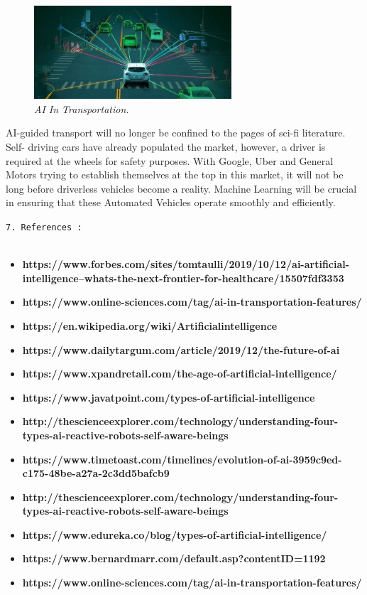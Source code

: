 \documentclass{article}
\begin{document}
\begin{figure}
\centering
\includegraphics[width=2.9in]{AI Transport}

\caption{\textit{AI In Transportation.}}
\end{figure}
AI-guided transport will no longer be confined to the pages of sci-fi literature. Self- driving cars have already populated the market, however, a driver is required at the wheels for safety purposes. With Google, Uber and General Motors trying to establish themselves at the top in this market, it will not be long before driverless vehicles become a reality. Machine Learning will be crucial in ensuring that these Automated Vehicles operate smoothly and efficiently.\\[2cm]


\begin{large}
\texttt{7. References :}\\\\
\end{large}

\begin{itemize}
\item\textbf{https://www.forbes.com/sites/tomtaulli/2019/10/12/ai-artificial-intelligence--whats-the-next-frontier-for-healthcare/15507fdf3353}
\item\textbf{https://www.online-sciences.com/tag/ai-in-transportation-features/}
\item\textbf{https://en.wikipedia.org/wiki/Artificialintelligence}
\item\textbf{https://www.dailytargum.com/article/2019/12/the-future-of-ai}
\item\textbf{https://www.xpandretail.com/the-age-of-artificial-intelligence/}
\item\textbf{https://www.javatpoint.com/types-of-artificial-intelligence}
\item\textbf{http://thescienceexplorer.com/technology/understanding-four-types-ai-reactive-robots-self-aware-beings}
\item\textbf{https://www.timetoast.com/timelines/evolution-of-ai-3959c9ed-c175-48be-a27a-2c3dd5bafcb9}
\item\textbf{http://thescienceexplorer.com/technology/understanding-four-types-ai-reactive-robots-self-aware-beings}
\item\textbf{https://www.edureka.co/blog/types-of-artificial-intelligence/}
\item\textbf{https://www.bernardmarr.com/default.asp?contentID=1192}
\item\textbf{https://www.online-sciences.com/tag/ai-in-transportation-features/}


\end{itemize}


 
 
 
 
\end{document}
